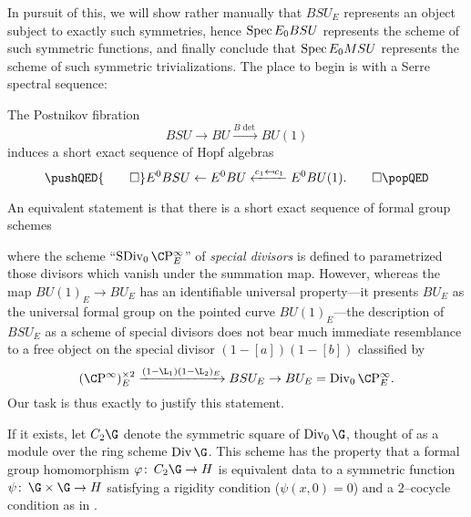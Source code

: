 \noindent In pursuit of this, we will show rather manually that $BSU_E$ represents an object subject to exactly such symmetries, hence $\operatorname{Spec} E_0 BSU$ represents the scheme of such symmetric functions, and finally conclude that $\operatorname{Spec} E_0 MSU$ represents the scheme of such symmetric trivializations.  The place to begin is with a Serre spectral sequence:
\begin{lemma}\label{BSUtoBUtoCPinftyIsSexseq}
The Postnikov fibration \[BSU \to BU \xrightarrow{B\det} BU(1)\] induces a short exact sequence of Hopf algebras
\[\pushQED{\qed}
E^0 BSU \from E^0 BU \xleftarrow{c_1 \mapsfrom c_1} E^0 BU(1). \qedhere
\popQED\]
\end{lemma}

\noindent An equivalent statement is that there is a short exact sequence of formal group schemes
\begin{center}
\end{center}
where the scheme ``$\SDiv_0 \CP^\infty_E$'' of \textit{special divisors} is defined to parametrized those divisors which vanish under the summation map.  However, whereas the map $BU(1)_E \to BU_E$ has an identifiable universal property---it presents $BU_E$ as the universal formal group on the pointed curve $BU(1)_E$---the description of $BSU_E$ as a scheme of special divisors does not bear much immediate resemblance to a free object on the special divisor $(1 - [a])(1 - [b])$ classified by \[(\CP^\infty)^{\times 2}_E \xrightarrow{(1 - \L_1)(1 - \L_2)_E} BSU_E \to BU_E = \Div_0 \CP^\infty_E.\]  Our task is thus exactly to justify this statement.

\begin{definition}\label{DefinitionOfC2G}
If it exists, let $C_2 \G$ denote the symmetric square of $\Div_0 \G$, thought of as a module over the ring scheme $\Div \G$.  This scheme has the property that a formal group homomorphism $\phi\co C_2 \G \to H$ is equivalent data to a symmetric function $\psi\co \G \times \G \to H$ satisfying a rigidity condition ($\psi(x, 0) = 0$) and a $2$--cocycle condition as in .
\end{definition}

